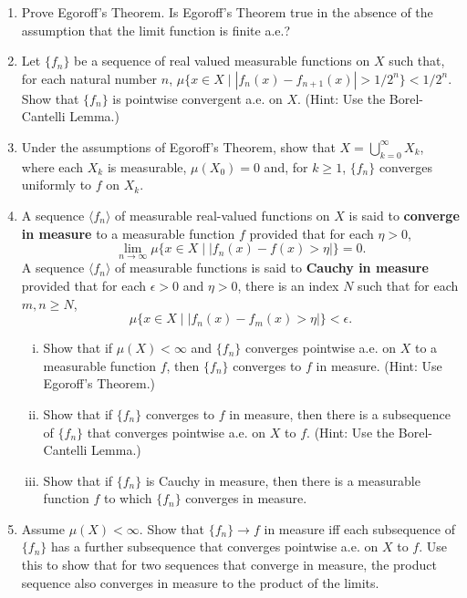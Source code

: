 \begin{enumerate}
\begin{enumerate}[(i)]
    \end{enumerate}
    \item Prove Egoroff's Theorem.
    Is Egoroff's Theorem true in the absence of the assumption that the limit function is finite a.e.?
    \item Let $\{f_n\}$ be a sequence of real valued measurable functions on $X$ such that, for each natural number $n$, $\mu\{x\in X\mid |f_n(x)-f_{n+1}(x)|>1/2^n\}<1/2^n$.
    Show that $\{f_n\}$ is pointwise convergent a.e. on $X$. 
    (Hint: Use the Borel-Cantelli Lemma.)
    \item Under the assumptions of Egoroff's Theorem, show that $X=\bigcup_{k=0}^\infty X_k$, where each $X_k$ is measurable, $\mu(X_0)=0$ and, for $k\ge1$, $\{f_n\}$ converges uniformly to $f$ on $X_k$.
    \item A sequence $\langle f_n\rangle$ of measurable real-valued functions on $X$ is said to \textbf{converge in measure} to a measurable function $f$ provided that for each $\eta>0$,
    \[
        \lim_{n\to\infty}\mu\{x\in X\mid|f_n(x)-f(x)>\eta|\}=0.
    \]
    A sequence $\langle f_n\rangle$ of measurable functions is said to \textbf{Cauchy in measure} provided that for each $\epsilon>0$ and $\eta>0$, there is an index $N$ such that for each $m,n\ge N$,
    \[
        \mu\{x\in X\mid|f_n(x)-f_m(x)>\eta|\}<\epsilon.
    \]
    \begin{enumerate}[(i)]
        \item Show that if $\mu(X)<\infty$ and $\{f_n\}$ converges pointwise a.e. on $X$ to a measurable function $f$, then $\{f_n\}$ converges to $f$ in measure.
        (Hint: Use Egoroff's Theorem.)
        \item Show that if $\{f_n\}$ converges to $f$ in measure, then there is a subsequence of $\{f_n\}$ that converges pointwise a.e. on $X$ to $f$.
        (Hint: Use the Borel-Cantelli Lemma.)
        \item Show that if $\{f_n\}$ is Cauchy in measure, then there is a measurable function $f$ to which $\{f_n\}$ converges in measure.
    \end{enumerate}
    \item Assume $\mu(X)<\infty$.
    Show that $\{f_n\}\to f$ in measure iff each subsequence of $\{f_n\}$ has a further subsequence that converges pointwise a.e. on $X$ to $f$.
    Use this to show that for two sequences that converge in measure, the product sequence also converges in measure to the product of the limits.
\end{enumerate}


